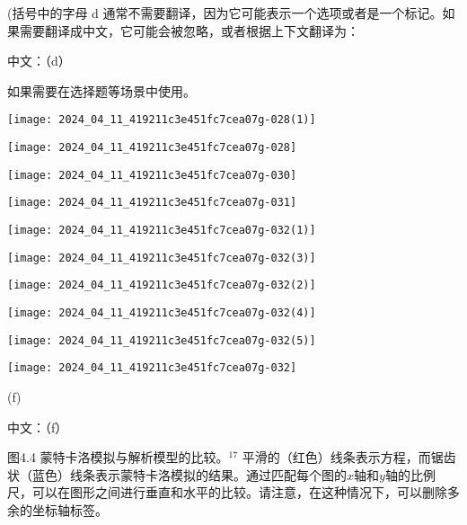 (括号中的字母 d 通常不需要翻译，因为它可能表示一个选项或者是一个标记。如果需要翻译成中文，它可能会被忽略，或者根据上下文翻译为：

中文：（d） 

如果需要在选择题等场景中使用。

\begin{center}
\texttt{[image: 2024\_04\_11\_419211c3e451fc7cea07g-028(1)]}
\end{center}
\begin{center}
\texttt{[image: 2024\_04\_11\_419211c3e451fc7cea07g-028]}
\end{center}
\begin{center}
\texttt{[image: 2024\_04\_11\_419211c3e451fc7cea07g-030]}
\end{center}
\begin{center}
\texttt{[image: 2024\_04\_11\_419211c3e451fc7cea07g-031]}
\end{center}
\begin{center}
\texttt{[image: 2024\_04\_11\_419211c3e451fc7cea07g-032(1)]}
\end{center}
\begin{center}
\texttt{[image: 2024\_04\_11\_419211c3e451fc7cea07g-032(3)]}
\end{center}
\begin{center}
\texttt{[image: 2024\_04\_11\_419211c3e451fc7cea07g-032(2)]}
\end{center}
\begin{center}
\texttt{[image: 2024\_04\_11\_419211c3e451fc7cea07g-032(4)]}
\end{center}
\begin{center}
\texttt{[image: 2024\_04\_11\_419211c3e451fc7cea07g-032(5)]}
\end{center}
\begin{center}
\texttt{[image: 2024\_04\_11\_419211c3e451fc7cea07g-032]}
\end{center}

(f)

中文：（f）

图4.4 蒙特卡洛模拟与解析模型的比较。${ }^{17}$ 平滑的（红色）线条表示方程，而锯齿状（蓝色）线条表示蒙特卡洛模拟的结果。通过匹配每个图的$x$轴和$y$轴的比例尺，可以在图形之间进行垂直和水平的比较。请注意，在这种情况下，可以删除多余的坐标轴标签。

